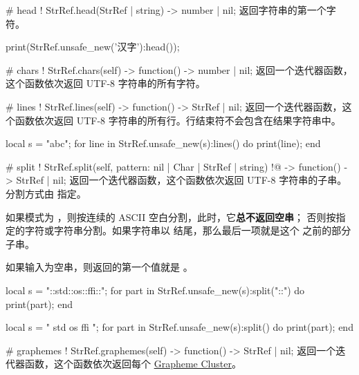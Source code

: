 \documentclass[class=article,doc={kv-usage}]{cusdoc}
\begin{document}
\begin{luadoc*}{}
# head
! StrRef.head(StrRef | string) -> number | nil;
返回字符串的第一个字符。
\end{luadoc*}

\begin{luarun}{}
print(StrRef.unsafe_new('汉字'):head());
\end{luarun}

\begin{luadoc*}{}
# chars
! StrRef.chars(self) -> function() -> number | nil;
返回一个迭代器函数，这个函数依次返回 UTF-8 字符串的所有字符。
\end{luadoc*}

\begin{luadoc*}{}
# lines
! StrRef.lines(self) -> function() -> StrRef | nil;
返回一个迭代器函数，这个函数依次返回 UTF-8 字符串的所有行。行结束符不会包含在结果字符串中。
\end{luadoc*}

\begin{luarun}{}
local s = "abc";
for line in StrRef.unsafe_new(s):lines() do
    print(line);
end
\end{luarun}

\begin{luadoc*}{}
# split
! StrRef.split(self, pattern: nil | Char | StrRef | string)
!@            -> function() -> StrRef | nil;
返回一个迭代器函数，这个函数依次返回 UTF-8 字符串的子串。分割方式由  指定。

如果模式为 ，则按连续的 ASCII 空白分割，此时，它\textbf{总不返回空串}；
否则按指定的字符或字符串分割。如果字符串以  结尾，那么最后一项就是这个  之前的部分子串。

如果输入为空串，则返回的第一个值就是 。
\end{luadoc*}

\begin{luarun}{}
local s = "::std::os::ffi::";
for part in StrRef.unsafe_new(s):split("::") do
    print(part);
end
\end{luarun}

\begin{luarun}{}
local s = "  std  os ffi \n ";
for part in StrRef.unsafe_new(s):split() do
    print(part);
end
\end{luarun}

\begin{luadoc*}{}
# graphemes
! StrRef.graphemes(self) -> function() -> StrRef | nil;
返回一个迭代器函数，这个函数依次返回每个 \href{https://www.unicode.org/reports/tr29/#Grapheme_Cluster_Boundaries}{Grapheme Cluster}。
\end{luadoc*}
\end{document}
